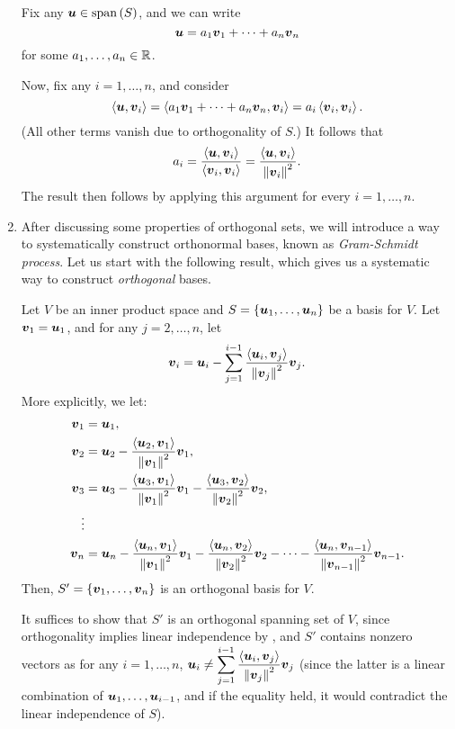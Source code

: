 \begin{enumerate}
\begin{pf}
Fix any \(\vb*{u}\in\operatorname{span}\qty(S)\), and we can write
\[
\vb*{u}=a_1\vb*{v}_1+\dotsb+a_n\vb*{v}_n
\]
for some \(a_1,\dotsc,a_n\in\mathbb{R}\).

Now, fix any \(i=1,\dotsc,n\), and consider
\[
\left\langle \vb*{u},\vb*{v}_i\right\rangle=\left\langle a_1\vb*{v}_1+\dotsb+a_n\vb*{v}_n,\vb*{v}_i\right\rangle
=a_i\left\langle \vb*{v}_i,\vb*{v}_i\right\rangle.
\]
(All other terms vanish due to orthogonality of \(S\).) It follows that
\[
a_i=\frac{\left\langle \vb*{u},\vb*{v}_i\right\rangle}{\left\langle \vb*{v}_i,\vb*{v}_i\right\rangle}
=\frac{\left\langle \vb*{u},\vb*{v}_i\right\rangle}{\norm{\vb*{v}_i}^{2}}.
\]
The result then follows by applying this argument for every \(i=1,\dotsc,n\).
\end{pf}

\item After discussing some properties of orthogonal sets, we will introduce a
way to systematically construct orthonormal bases, known as \emph{Gram-Schmidt
process}. Let us start with the following result, which gives us a systematic
way to construct \emph{orthogonal} bases.

\begin{theorem}
\label{thm:construct-orthog-basis}
Let \(V\) be an inner product space and \(S=\{\vb*{u}_1,\dotsc,\vb*{u}_n\}\)
be a basis for \(V\). Let \(\vb*{v}_1=\vb*{u}_1\), and for any
\(j=2,\dotsc,n\), let
\[
\vb*{v}_i=\vb*{u}_i-\sum_{j=1}^{i-1}\frac{\left\langle \vb*{u}_i,\vb*{v}_j\right\rangle}{\norm{\vb*{v}_j}^{2}}\vb*{v}_j.
\]
More explicitly, we let:
\begin{align*}
\vb*{v}_1&=\vb*{u}_1, \\
\vb*{v}_2&=\vb*{u}_2-\frac{\left\langle \vb*{u}_2,\vb*{v}_1\right\rangle}{\norm{\vb*{v}_1}^{2}}\vb*{v}_1, \\
\vb*{v}_3&=\vb*{u}_3-\frac{\left\langle \vb*{u}_3,\vb*{v}_1\right\rangle}{\norm{\vb*{v}_1}^{2}}\vb*{v}_1 
-\frac{\left\langle \vb*{u}_3,\vb*{v}_2\right\rangle}{\norm{\vb*{v}_2}^{2}}\vb*{v}_2, \\
\vdots \\
\vb*{v}_n&=\vb*{u}_n-\frac{\left\langle \vb*{u}_n,\vb*{v}_1\right\rangle}{\norm{\vb*{v}_1}^{2}}\vb*{v}_1
-\frac{\left\langle \vb*{u}_n,\vb*{v}_2\right\rangle}{\norm{\vb*{v}_2}^{2}}\vb*{v}_2
-\dotsb
-\frac{\left\langle \vb*{u}_n,\vb*{v}_{n-1}\right\rangle}{\norm{\vb*{v}_{n-1}}^{2}}\vb*{v}_{n-1}.
\end{align*}
Then, \(S'=\{\vb*{v}_1,\dotsc,\vb*{v}_n\}\) is an orthogonal basis for \(V\).
\end{theorem}
\begin{pf}
It suffices to show that \(S'\) is an orthogonal spanning set of \(V\), since
orthogonality implies linear independence by , and
\(S'\) contains nonzero vectors as for any \(i=1,\dotsc,n\), \(\displaystyle
\vb*{u}_i\ne\sum_{j=1}^{i-1}\frac{\left\langle \vb*{u}_i,\vb*{v}_j\right\rangle}{\norm{\vb*{v}_j}^{2}}\vb*{v}_j\)
(since the latter is a linear combination of
\(\vb*{u}_1,\dotsc,\vb*{u}_{i-1}\), and if the equality held, it would
contradict the linear independence of \(S\)).


\end{pf}
\end{enumerate}
